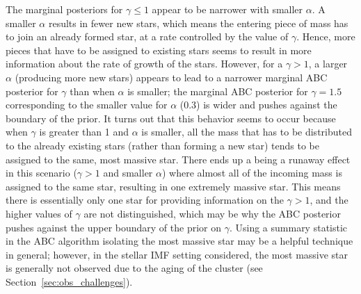 \documentclass[ejs]{imsart}
\numberwithin{equation}{section}
\theoremstyle{plain}
\begin{document}
The marginal posteriors for $\gamma \leq 1$ appear to be narrower with smaller $\alpha$.  
A smaller $\alpha$ results in fewer new stars, which means the entering piece of mass has to join an already formed star, at a rate controlled by the value of $\gamma$.  Hence, more pieces that have to be assigned to existing stars seems to result in more information about the rate of growth of the stars.
%
However, for a  $\gamma > 1$, a larger $\alpha$ (producing more new stars) appears to lead to a narrower marginal ABC posterior for $\gamma$ than when $\alpha$ is smaller; the marginal ABC posterior for $\gamma = 1.5$ corresponding to the smaller value for $\alpha$ (0.3) is wider and pushes against the boundary of the prior.  
%
It turns out that this behavior seems to occur because when $\gamma$ is greater than 1 and $\alpha$ is smaller, all the mass that has to be distributed to the already existing stars (rather than forming a new star) tends to be assigned to the same, most massive star.  
%
There ends up a being a runaway effect in this scenario ($\gamma > 1$ and smaller $\alpha$) where almost all of the incoming mass is assigned to the same star, resulting in one extremely massive star.  This means there is essentially only one star for providing information on the $\gamma > 1$, and the higher values of $\gamma$ are not distinguished, which may be why the ABC posterior pushes against the upper boundary of the prior on $\gamma$.
Using a summary statistic in the ABC algorithm isolating the most massive star may be a helpful technique in general; however, in the stellar IMF setting considered, the most massive star is generally not observed due to the aging of the cluster (see Section~\ref{sec:obs_challenges}).  
\end{document}
